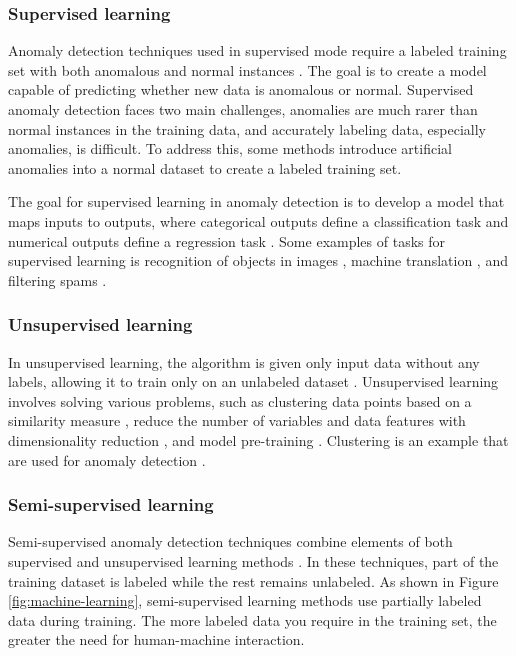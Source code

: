 \subsubsection{Supervised learning}
Anomaly detection techniques used in supervised mode require a labeled training set with both anomalous and normal instances \cite{Varun2009Anomaly}. The goal is to create a model capable of predicting whether new data is anomalous or normal. Supervised anomaly detection faces two main challenges, anomalies are much rarer than normal instances in the training data, and accurately labeling data, especially anomalies, is difficult. To address this, some methods introduce artificial anomalies into a normal dataset to create a labeled training set. 

The goal for supervised learning in anomaly detection is to develop a model that maps inputs to outputs, where categorical outputs define a classification task and numerical outputs define a regression task \cite{8406613}. Some examples of tasks for supervised learning is recognition of objects in images \cite{article}, machine translation \cite{10.5555/2969033.2969173}, and filtering spams \cite{788645}.

\subsubsection{Unsupervised learning}
In unsupervised learning, the algorithm is given only input data without any labels, allowing it to train only on an unlabeled dataset \cite{ElNaqa2015}. Unsupervised learning involves solving various problems, such as clustering data points based on a similarity measure \cite{10.1145/331499.331504}, reduce the number of variables and data features with dimensionality reduction \cite{alex2012universityoftoronto}, and model pre-training \cite{10.5555/1756006.1756025}. Clustering is an example that are used for anomaly detection \cite{Varun2009Anomaly}.

\subsubsection{Semi-supervised learning}
Semi-supervised anomaly detection techniques combine elements of both supervised and unsupervised learning methods \cite{ElNaqa2015}. In these techniques, part of the training dataset is labeled while the rest remains unlabeled. As shown in Figure \ref{fig:machine-learning}, semi-supervised learning methods use partially labeled data during training. The more labeled data you require in the training set, the greater the need for human-machine interaction. 

